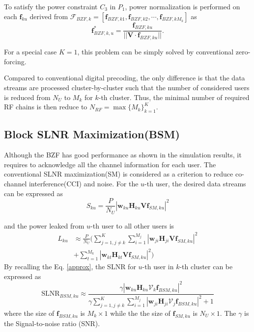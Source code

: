 \documentclass[conference]{IEEEtran}
\begin{document}
To satisfy the power constraint $C_3$ in $P_1$, power normalization is performed on each ${\bm f}_{ku}$ derived from $\bm{\mathcal{F}}_{BZF,k}=\left[\bm{f}_{BZF,k1},\bm{f}_{BZF,k2},\cdots,\bm{f}_{BZF,kM_k}\right]$ as
\begin{equation}\label{eq:ZFU-HBF2}
\bm{f}^*_{BZF,k,u} = {\frac{\bm{f}_{BZF,ku}}{||\bm{V}\cdot\bm{f}_{BZF,ku}||}}.
\end{equation}

For a special case $K=1$, this problem can be simply solved by conventional zero-forcing. 

Compared to conventional digital precoding, the only difference is that the data streams are processed cluster-by-cluster such that the number of considered users is reduced from $N_U$ to $M_k$ for $k$-th cluster. Thus, the minimal number of required RF chains is then reduce to $N_{RF} = \max \{M_k\}_{k=1}^K$. 


\subsection{Block SLNR Maximization(BSM)}
Although the BZF has good performance as shown in the simulation results, it requires to acknowledge all the channel information for each user.
The conventional SLNR maximization(SM) is considered as a criterion to reduce co-channel interference(CCI) and noise.  For the $u$-th user, the desired data streams can be expressed as 
\begin{equation}
	S_{ku} = \frac{P}{N_U}|\bm{w}_{ku} \bm{H}_{ku} \bm{V} \bm{f}_{SM,ku}|^2
\end{equation}

and the power leaked from $u$-th user to all other users is 
\begin{align}
L_{ku} &\approx \frac{P}{N_U}(\sum_{j=1,j\neq k}^{K}\sum_{i=1}^{M_j}|\bm{w}_{ji} \bm{H}_{ji} \bm{V} \bm{f}_{SM,ku}|^2\nonumber\\ 
&+ \sum_{t=1}^{M_k}|\bm{w}_{kt} \bm{H}_{kt} \bm{V}\bm{f}_{SM,ku}|^2)
\end{align}
By recalling the Eq. \eqref{approx}, the SLNR for $u$-th user in $k$-th cluster can be expressed as
\begin{equation}
	\text{SLNR}_{BSM, ku} \approx \frac{\gamma|\bm{w}_{ku} \bm{H}_{ku} \bm{\mathcal{V}}_k \bm{f}_{BSM,ku}|^2}{\gamma \sum_{j=1,j\neq k}^{K}\sum_{i=1}^{M_j}|\bm{w}_{ji} \bm{H}_{ji} \bm{\mathcal{V}}_j \bm{f}_{BSM,ku}|^2+1}
\end{equation}
where the size of $\bm{f}_{BSM,ku} $ is $M_k\times 1$ while the the size of $\bm{f}_{SM,ku}$ is $N_U \times 1$. The $\gamma$ is the Signal-to-noise ratio (SNR).
\end{document}
